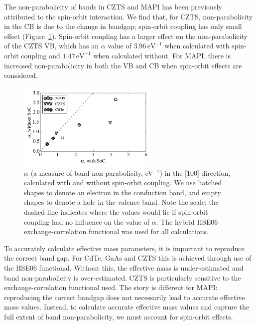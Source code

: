 The non-parabolicity of bands in CZTS\autocite{Ito2015} and MAPI\autocite{Brivio2014,Mosconi2017} has been previously attributed to the spin-orbit interaction. 
We find that, for CZTS, non-parabolicity in the CB is due to the change in bandgap; spin-orbit coupling has only small effect (Figure\ \ref{alpha_SoC}). 
Spin-orbit coupling has a larger effect on the non-parabolicity of the CZTS VB, which has an $\alpha$ value of $3.96\,\textrm{eV}^{-1}$ when calculated with spin-orbit coupling and $1.47\,\textrm{eV}^{-1}$ when calculated without. 
For MAPI, there is increased non-parabolicity in both the VB and CB when spin-orbit effects are considered. 

\begin{figure}[tb] \centering
\includegraphics[width=0.6\textwidth]{./figures/ch4/alpha_SoC.png}
\caption[Band non-parabolicity and spin-orbit coupling]{\label{alpha_SoC}$\alpha$ (a measure of band non-parabolicity, eV$^{-1}$) in the [100] direction, calculated with and without spin-orbit coupling. We use hatched shapes to denote an electron in the conduction band, and empty shapes to denote a hole in the valence band. Note the scale; the dashed line indicates where the values would lie if spin-orbit coupling had no influence on the value of $\alpha$. The hybrid HSE06 exchange-correlation functional was used for all calculations. }
\end{figure}

To accurately calculate effective mass parameters, it is important to reproduce the correct band gap.
For CdTe, GaAs and CZTS this is achieved through use of the HSE06 functional.
Without this, the effective mass is under-estimated and band non-parabolicity is over-estimated.
CZTS is particularly sensitive to the exchange-correlation functional used.
The story is different for MAPI: 
reproducing the correct bandgap does not necessarily lead to accurate effective mass values.
Instead, to calculate accurate effective mass values and capture the full extent of band non-parabolicity, we must account for spin-orbit effects.

